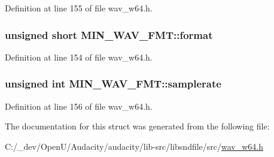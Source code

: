 Definition at line 155 of file wav\+\_\+w64.\+h.

\subsubsection[{\texorpdfstring{format}{format}}]{\setlength{\rightskip}{0pt plus 5cm}unsigned short M\+I\+N\+\_\+\+W\+A\+V\+\_\+\+F\+M\+T\+::format}\hypertarget{struct_m_i_n___w_a_v___f_m_t_a4eb0c609627d059cca3519df39250acd}{}\label{struct_m_i_n___w_a_v___f_m_t_a4eb0c609627d059cca3519df39250acd}


Definition at line 154 of file wav\+\_\+w64.\+h.

\subsubsection[{\texorpdfstring{samplerate}{samplerate}}]{\setlength{\rightskip}{0pt plus 5cm}unsigned {\bf int} M\+I\+N\+\_\+\+W\+A\+V\+\_\+\+F\+M\+T\+::samplerate}\hypertarget{struct_m_i_n___w_a_v___f_m_t_aa2f057b10fa3d61f779e582a300ea795}{}\label{struct_m_i_n___w_a_v___f_m_t_aa2f057b10fa3d61f779e582a300ea795}


Definition at line 156 of file wav\+\_\+w64.\+h.



The documentation for this struct was generated from the following file\+:\begin{DoxyCompactItemize}
\item 
C\+:/\+\_\+dev/\+Open\+U/\+Audacity/audacity/lib-\/src/libsndfile/src/\hyperlink{wav__w64_8h}{wav\+\_\+w64.\+h}\end{DoxyCompactItemize}
